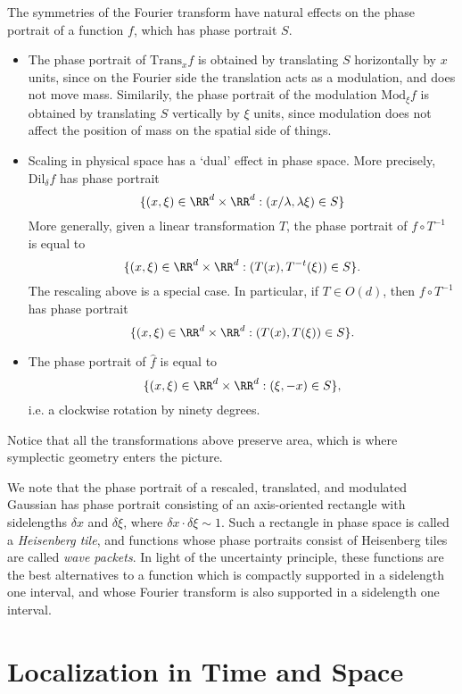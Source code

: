 The symmetries of the Fourier transform have natural effects on the phase portrait of a function $f$, which has phase portrait $S$.

\begin{itemize}
  \item The phase portrait of $\text{Trans}_x f$ is obtained by translating $S$ horizontally by $x$ units, since on the Fourier side the translation acts as a modulation, and does not move mass. Similarily, the phase portrait of the modulation $\text{Mod}_\xi f$ is obtained by translating $S$ vertically by $\xi$ units, since modulation does not affect the position of mass on the spatial side of things.

  \item Scaling in physical space has a `dual' effect in phase space. More precisely, $\text{Dil}_\delta f$ has phase portrait
  \[ \{ (x,\xi) \in \RR^d \times \RR^d: (x/\lambda, \lambda \xi) \in S \} \]
  More generally, given a linear transformation $T$, the phase portrait of $f \circ T^{-1}$ is equal to
  \[ \{ (x,\xi) \in \RR^d \times \RR^d: (T(x), T^{-t}(\xi)) \in S \}. \]
  The rescaling above is a special case. In particular, if $T \in O(d)$, then $f \circ T^{-1}$ has phase portrait
  \[ \{ (x,\xi) \in \RR^d \times \RR^d: (T(x), T(\xi)) \in S \}. \]

  \item The phase portrait of $\widehat{f}$ is equal to
  \[ \{ (x,\xi) \in \RR^d \times \RR^d: (\xi,-x) \in S \}, \]
  i.e. a clockwise rotation by ninety degrees.
\end{itemize}

Notice that all the transformations above preserve area, which is where symplectic geometry enters the picture.

We note that the phase portrait of a rescaled, translated, and modulated Gaussian has phase portrait consisting of an axis-oriented rectangle with sidelengths $\delta x$ and $\delta \xi$, where $\delta x \cdot \delta \xi \sim 1$. Such a rectangle in phase space is called a \emph{Heisenberg tile}, and functions whose phase portraits consist of Heisenberg tiles are called \emph{wave packets}. In light of the uncertainty principle, these functions are the best alternatives to a function which is compactly supported in a sidelength one interval, and whose Fourier transform is also supported in a sidelength one interval.

\section{Localization in Time and Space}


